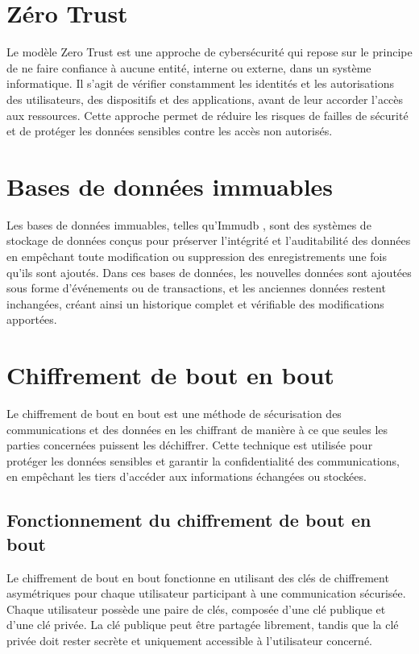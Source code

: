 \section{Zéro Trust}
Le modèle Zero Trust est une approche de cybersécurité qui repose sur le principe de ne faire confiance à aucune entité, interne ou externe, dans un système informatique. Il s'agit de vérifier constamment les identités et les autorisations des utilisateurs, des dispositifs et des applications, avant de leur accorder l'accès aux ressources. Cette approche permet de réduire les risques de failles de sécurité et de protéger les données sensibles contre les accès non autorisés.

\section{Bases de données immuables}
Les bases de données immuables, telles qu'Immudb \cite{immudb}, sont des systèmes de stockage de données conçus pour préserver l'intégrité et l'auditabilité des données en empêchant toute modification ou suppression des enregistrements une fois qu'ils sont ajoutés. Dans ces bases de données, les nouvelles données sont ajoutées sous forme d'événements ou de transactions, et les anciennes données restent inchangées, créant ainsi un historique complet et vérifiable des modifications apportées.

\section{Chiffrement de bout en bout}
Le chiffrement de bout en bout est une méthode de sécurisation des communications et des données en les chiffrant de manière à ce que seules les parties concernées puissent les déchiffrer. Cette technique est utilisée pour protéger les données sensibles et garantir la confidentialité des communications, en empêchant les tiers d'accéder aux informations échangées ou stockées.

\subsection{Fonctionnement du chiffrement de bout en bout}
Le chiffrement de bout en bout fonctionne en utilisant des clés de chiffrement asymétriques pour chaque utilisateur participant à une communication sécurisée. Chaque utilisateur possède une paire de clés, composée d'une clé publique et d'une clé privée. La clé publique peut être partagée librement, tandis que la clé privée doit rester secrète et uniquement accessible à l'utilisateur concerné.

